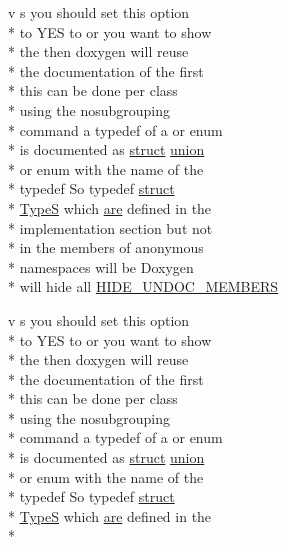 \begin{DoxyCompactItemize}
\item 
v s you should set this option \\*
to Y\-E\-S to or you want to show \\*
the then doxygen will reuse \\*
the documentation of the first \\*
this can be done per class \\*
using the nosubgrouping \\*
command a typedef of a or enum \\*
is documented as \hyperlink{mkdoc_8dox_aba655c5729da86df745f0c8e7f9ba8d2}{struct} \hyperlink{mkdoc_8dox_a68000add3c95d09ceb97c3079515907d}{union} \\*
or enum with the name of the \\*
typedef So typedef \hyperlink{mkdoc_8dox_aba655c5729da86df745f0c8e7f9ba8d2}{struct} \\*
\hyperlink{mkdoc_8dox_a25dd1c015abaf1e4f2c6879012f4f170}{Type\-S} which \hyperlink{mkdoc_8dox_a6d0965b20c4eb2235e8f9f5f0e5193ae}{are} defined in the \\*
implementation section but not \\*
in the members of anonymous \\*
namespaces will be Doxygen \\*
will hide all \hyperlink{mkdoc_8dox_aa8c460aa75e1350ef6bebbac97c2aeff}{H\-I\-D\-E\-\_\-\-U\-N\-D\-O\-C\-\_\-\-M\-E\-M\-B\-E\-R\-S}
\item 
v s you should set this option \\*
to Y\-E\-S to or you want to show \\*
the then doxygen will reuse \\*
the documentation of the first \\*
this can be done per class \\*
using the nosubgrouping \\*
command a typedef of a or enum \\*
is documented as \hyperlink{mkdoc_8dox_aba655c5729da86df745f0c8e7f9ba8d2}{struct} \hyperlink{mkdoc_8dox_a68000add3c95d09ceb97c3079515907d}{union} \\*
or enum with the name of the \\*
typedef So typedef \hyperlink{mkdoc_8dox_aba655c5729da86df745f0c8e7f9ba8d2}{struct} \\*
\hyperlink{mkdoc_8dox_a25dd1c015abaf1e4f2c6879012f4f170}{Type\-S} which \hyperlink{mkdoc_8dox_a6d0965b20c4eb2235e8f9f5f0e5193ae}{are} defined in the \\*

\end{DoxyCompactItemize}
